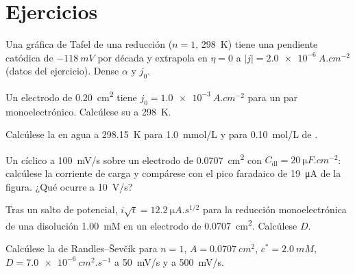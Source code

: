 \section{Ejercicios}

\begin{exercise}[$\star$]\label{exo:b3:electrode-kinetics:1}
Una gráfica de Tafel de una reducción ($n = 1$, \qty{298}{K}) tiene una pendiente catódica de $-\qty{118}{mV}$
por década y extrapola en $\eta = 0$ a $|j| = \qty{2.0e-6}{A.cm^{-2}}$ (datos del ejercicio).
Dense $\alpha$ y $j_0$.
\end{exercise}

\begin{exercise}[$\star$]\label{exo:b3:electrode-kinetics:2}
Un electrodo de \qty{0.20}{cm^2} tiene $j_0 = \qty{1.0e-3}{A.cm^{-2}}$ para un par monoelectrónico.
Calcúlese su  a \qty{298}{K}.
\end{exercise}

\begin{exercise}[$\star$]\label{exo:b3:electrode-kinetics:3}
Calcúlese la  en agua a \qty{298.15}{K} para \qty{1.0}{mmol/L} y para \qty{0.10}{mol/L}
de .
\end{exercise}

\begin{exercise}[$\star$]\label{exo:b3:electrode-kinetics:4}
Un  cíclico a \qty{100}{mV/s} sobre un electrodo de \qty{0.0707}{cm^2} con $C_{\mathrm{dl}} =
\qty{20}{\micro F.cm^{-2}}$: calcúlese la corriente de carga y compárese con el
pico faradaico de \qty{19}{\micro A} de la figura. ¿Qué ocurre a \qty{10}{V/s}?
\end{exercise}

\begin{exercise}[$\star\star$]\label{exo:b3:electrode-kinetics:5}
Tras un salto de potencial, $i\sqrt t = \qty{12.2}{\micro A.s^{1/2}}$ para la reducción monoelectrónica de una
disolución \qty{1.00}{mM} en un electrodo de \qty{0.0707}{cm^2}. Calcúlese $D$.
\end{exercise}

\begin{exercise}[$\star\star$]\label{exo:b3:electrode-kinetics:6}
Calcúlese la  de Randles--Ševčík para $n = 1$, $A = \qty{0.0707}{cm^2}$, $c^* = \qty{2.0}{mM}$,
$D = \qty{7.0e-6}{cm^2.s^{-1}}$ a \qty{50}{mV/s} y a \qty{500}{mV/s}.
\end{exercise}

